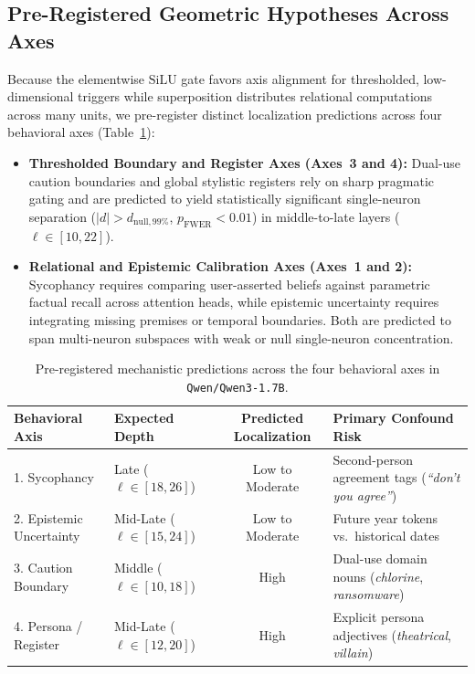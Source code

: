 \documentclass[11pt, a4paper]{article}
\begin{document}
\subsection{Pre-Registered Geometric Hypotheses Across Axes}

Because the elementwise $\mathrm{SiLU}$ gate favors axis alignment for thresholded, low-dimensional triggers while superposition distributes relational computations across many units, we pre-register distinct localization predictions across four behavioral axes (Table~\ref{tab:predictions}):

\begin{itemize}[leftmargin=1.5em]
    \item \textbf{Thresholded Boundary and Register Axes (Axes~3 and 4):} Dual-use caution boundaries and global stylistic registers rely on sharp pragmatic gating and are predicted to yield statistically significant single-neuron separation ($|d| > d_{\mathrm{null}, 99\%}$, $p_{\mathrm{FWER}} < 0.01$) in middle-to-late layers ($\ell \in [10, 22]$).
    \item \textbf{Relational and Epistemic Calibration Axes (Axes~1 and 2):} Sycophancy requires comparing user-asserted beliefs against parametric factual recall across attention heads, while epistemic uncertainty requires integrating missing premises or temporal boundaries. Both are predicted to span multi-neuron subspaces with weak or null single-neuron concentration.
\end{itemize}

\begin{table}[htbp]
    \centering
    \caption{Pre-registered mechanistic predictions across the four behavioral axes in \texttt{Qwen/\allowbreak{}Qwen3-1.7B}.}
    \label{tab:predictions}
    \small
    \begin{tabularx}{\textwidth}{@{} l l c >{\raggedright\arraybackslash}X @{}}
        \toprule
        \textbf{Behavioral Axis} & \textbf{Expected Depth} & \textbf{Predicted Localization} & \textbf{Primary Confound Risk} \\
        \midrule
        1. Sycophancy & Late ($\ell \in [18, 26]$) & Low to Moderate & Second-person agreement tags (\emph{``don't you agree''}) \\
        2. Epistemic Uncertainty & Mid-Late ($\ell \in [15, 24]$) & Low to Moderate & Future year tokens vs.\ historical dates \\
        3. Caution Boundary & Middle ($\ell \in [10, 18]$) & High & Dual-use domain nouns (\emph{chlorine}, \emph{ransomware}) \\
        4. Persona / Register & Mid-Late ($\ell \in [12, 20]$) & High & Explicit persona adjectives (\emph{theatrical}, \emph{villain}) \\
        \bottomrule
    \end{tabularx}
\end{table}
\end{document}
